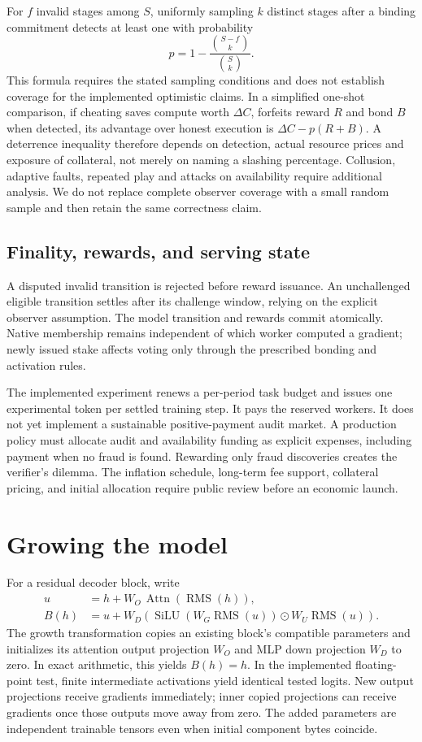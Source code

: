 \documentclass[11pt]{article}
\begin{document}
For $f$ invalid stages among $S$, uniformly sampling $k$ distinct stages after a
binding commitment detects at least one with probability
\begin{equation}
 p=1-\frac{\binom{S-f}{k}}{\binom{S}{k}}.
\end{equation}
This formula requires the stated sampling conditions and does not establish
coverage for the implemented optimistic claims. In a simplified one-shot
comparison, if cheating saves compute worth $\Delta C$, forfeits reward $R$
and bond $B$ when detected, its advantage over honest execution is
$\Delta C-p(R+B)$. A deterrence inequality therefore depends on detection,
actual resource prices and exposure of collateral, not merely on naming a
slashing percentage. Collusion, adaptive faults, repeated play and attacks on
availability require additional analysis. We do not replace complete observer
coverage with a small random sample and then retain the same correctness claim.

\subsection{Finality, rewards, and serving state}
A disputed invalid transition is rejected before reward issuance. An unchallenged eligible transition settles after its challenge window, relying on the explicit observer assumption. The model transition and rewards commit atomically. Native membership remains independent of which worker computed a gradient; newly issued stake affects voting only through the prescribed bonding and activation rules.

The implemented experiment renews a per-period task budget and issues one experimental token per settled training step. It pays the reserved workers. It does not yet implement a sustainable positive-payment audit market. A production policy must allocate audit and availability funding as explicit expenses, including payment when no fraud is found. Rewarding only fraud discoveries creates the verifier's dilemma. The inflation schedule, long-term fee support, collateral pricing, and initial allocation require public review before an economic launch.

\section{Growing the model}
For a residual decoder block, write
\begin{align}
 u&=h+W_O\,\operatorname{Attn}(\operatorname{RMS}(h)),\\
 B(h)&=u+W_D\left(\operatorname{SiLU}(W_G\operatorname{RMS}(u))\odot W_U\operatorname{RMS}(u)\right).
\end{align}
The growth transformation copies an existing block's compatible parameters and initializes its attention output projection $W_O$ and MLP down projection $W_D$ to zero. In exact arithmetic, this yields $B(h)=h$. In the implemented floating-point test, finite intermediate activations yield identical tested logits. New output projections receive gradients immediately; inner copied projections can receive gradients once those outputs move away from zero. The added parameters are independent trainable tensors even when initial component bytes coincide.
\end{document}
